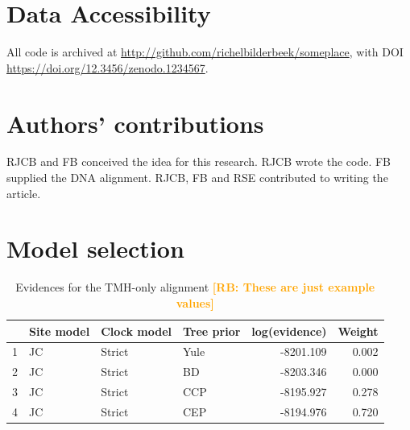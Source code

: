 \documentclass{article}
\newcommand{\richel}[1]{\textcolor{orange}{\textbf{[RB: #1]}}}
\begin{document}
\section{Data Accessibility}

All code is archived at \url{http://github.com/richelbilderbeek/someplace},
with DOI \url{https://doi.org/12.3456/zenodo.1234567}.

\section{Authors' contributions}

RJCB and FB conceived the idea for this research. 
RJCB wrote the code.
FB supplied the DNA alignment.
RJCB, FB and RSE contributed to writing the article.




\appendix

\section{Model selection}

\begin{table}[ht]
\centering
\begin{tabular}{rlllrr}
  \hline
 & Site model & Clock model & Tree prior & log(evidence) & Weight \\ 
  \hline
1 & JC & Strict & Yule & -8201.109 & 0.002 \\ 
  2 & JC & Strict & BD & -8203.346 & 0.000 \\ 
  3 & JC & Strict & CCP & -8195.927 & 0.278 \\ 
  4 & JC & Strict & CEP & -8194.976 & 0.720 \\ 
   \hline
\end{tabular}
\caption{
  Evidences for the TMH-only alignment
  \richel{These are just example values}
} 
\label{tab:evidences_tmh}
\end{table}
\end{document}

